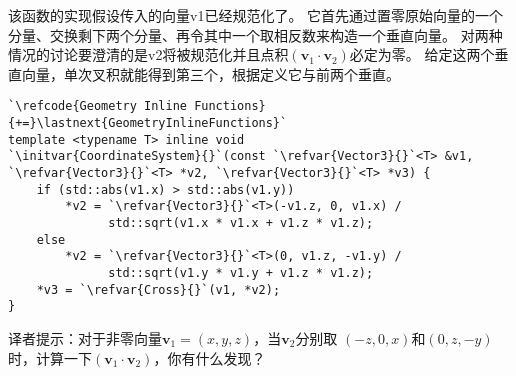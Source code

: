 该函数的实现假设传入的向量{\ttfamily v1}已经规范化了。
它首先通过置零原始向量的一个分量、交换剩下两个分量、再令其中一个取相反数来构造一个垂直向量。
对两种情况的讨论要澄清的是{\ttfamily v2}将被规范化并且点积$(\bm v_1\cdot\bm v_2)$必定为零。
给定这两个垂直向量，单次叉积就能得到第三个，根据定义它与前两个垂直。
\begin{lstlisting}
`\refcode{Geometry Inline Functions}{+=}\lastnext{GeometryInlineFunctions}`
template <typename T> inline void
`\initvar{CoordinateSystem}{}`(const `\refvar{Vector3}{}`<T> &v1, `\refvar{Vector3}{}`<T> *v2, `\refvar{Vector3}{}`<T> *v3) {
    if (std::abs(v1.x) > std::abs(v1.y))
        *v2 = `\refvar{Vector3}{}`<T>(-v1.z, 0, v1.x) /
              std::sqrt(v1.x * v1.x + v1.z * v1.z);
    else
        *v2 = `\refvar{Vector3}{}`<T>(0, v1.z, -v1.y) /
              std::sqrt(v1.y * v1.y + v1.z * v1.z);
    *v3 = `\refvar{Cross}{}`(v1, *v2);
}
\end{lstlisting}
\begin{remark}
    译者提示：对于非零向量$\bm v_1=(x,y,z)$，当$\bm v_2$分别取
    $(-z,0,x)$和$(0,z,-y)$时，计算一下$(\bm v_1\cdot\bm v_2)$，你有什么发现？
\end{remark}